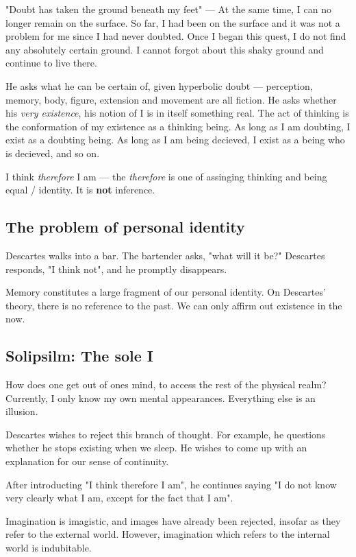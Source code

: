 \documentclass[11pt]{book}
\begin{document}
"Doubt has taken the ground beneath my feet" --- At the same time, I can no
longer remain on the surface. So far, I had been on the surface and it was not
a problem for me since I had never doubted. Once I began this quest, I do not
find any absolutely certain ground. I cannot forgot about this shaky ground
and continue to live there.

He asks what he can be certain of, given hyperbolic doubt --- perception,
memory, body, figure, extension and movement are all fiction. He asks whether
his \textit{very existence}, his notion of I is in itself something real. The
act of thinking is the conformation of my existence as a thinking being. As long
as I am doubting, I exist as a doubting being. As long as I am being decieved,
I exist as a being who is decieved, and so on.

I think \textit{therefore} I am --- the \textit{therefore} is one of assinging
thinking and being equal / identity. It is \textbf{not} inference.

\subsection{The problem of personal identity}
Descartes walks into a bar. The bartender asks, "what will it be?" Descartes
responds, "I think not", and he promptly disappears.

Memory constitutes a large fragment of our personal identity. On Descartes'
theory, there is no reference to the past. We can only affirm out existence
in the now.

\subsection{Solipsilm: The sole I}

How does one get out of ones mind, to access the rest of the physical realm?
Currently, I only know my own mental appearances. Everything else is an
illusion.

Descartes wishes to reject this branch of thought. For example, he questions
whether he stops existing when we sleep. He wishes to come up with an 
explanation for our sense of continuity.


After introducting "I think therefore I am", he continues saying "I do not know
very clearly what I am, except for the fact that I am".

Imagination is imagistic, and images have already been rejected, insofar
as they refer to the external world. However, imagination which refers to the
internal world is indubitable.
\end{document}
